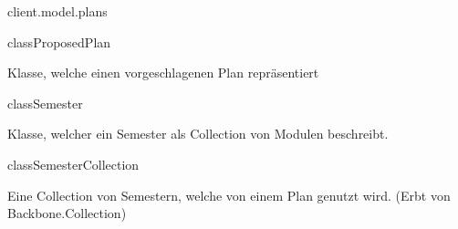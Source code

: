 \begin{texdocpackage}{client.model.plans}
\begin{texdocclass}{class}{ProposedPlan}
\label{texdoclet:edu.kit.informatik.studyplan.client.model.plans.ProposedPlan}
\begin{texdocclassintro}
Klasse, welche einen vorgeschlagenen Plan repräsentiert\end{texdocclassintro}
\begin{texdocclassconstructors}
\end{texdocclassconstructors}
\begin{texdocclassmethods}
\end{texdocclassmethods}
\end{texdocclass}


\begin{texdocclass}{class}{Semester}
\label{texdoclet:edu.kit.informatik.studyplan.client.model.plans.Semester}
\begin{texdocclassintro}
Klasse, welcher ein Semester als Collection von Modulen beschreibt.\end{texdocclassintro}
\begin{texdocclassconstructors}
\end{texdocclassconstructors}
\begin{texdocclassmethods}
\end{texdocclassmethods}
\end{texdocclass}


\begin{texdocclass}{class}{SemesterCollection}
\label{texdoclet:edu.kit.informatik.studyplan.client.model.plans.SemesterCollection}
\begin{texdocclassintro}
Eine Collection von Semestern, welche von einem Plan genutzt wird. (Erbt von
 Backbone.Collection)\end{texdocclassintro}
\begin{texdocclassconstructors}
\end{texdocclassconstructors}
\end{texdocclass}


\end{texdocpackage}



